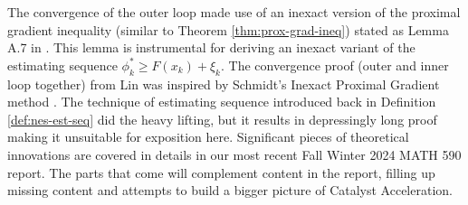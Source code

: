 \documentclass[12pt]{article}
\begin{document}
            The convergence of the outer loop made use of an inexact version of the proximal gradient inequality (similar to Theorem \ref{thm:prox-grad-ineq}) stated as Lemma A.7 in \cite{lin_universal_2015}. 
            This lemma is instrumental for deriving an inexact variant of the estimating sequence $\phi_k^* \ge F(x_k) + \xi_k$. 
            The convergence proof (outer and inner loop together) from Lin was inspired by Schmidt's Inexact Proximal Gradient method \cite{schmidt_convergence_2011}. 
            The technique of estimating sequence introduced back in Definition \ref{def:nes-est-seq} did the heavy lifting, but it results in depressingly long proof making it unsuitable for exposition here. 
            Significant pieces of theoretical innovations are covered in details in our most recent Fall Winter 2024 MATH 590 report. 
            The parts that come will complement content in the report, filling up missing content and attempts to build a bigger picture of Catalyst Acceleration. 
\end{document}
